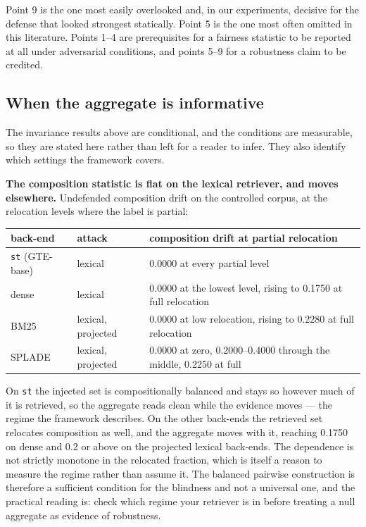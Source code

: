 \documentclass[authoryear,review,3p,times]{elsarticle}
\begin{document}
Point 9 is the one most easily overlooked and, in our experiments, decisive for the defense that looked strongest statically. Point 5 is the one most often omitted in this literature. Points 1--4 are prerequisites for a fairness statistic to be reported at all under adversarial conditions, and points 5--9 for a robustness claim to be credited.

\subsection{When the aggregate is informative}\label{scope-of-the-invariance}

The invariance results above are conditional, and the conditions are measurable, so they are stated here rather than left for a reader to infer. They also identify which settings the framework covers.

\textbf{The composition statistic is flat on the lexical retriever, and moves elsewhere.} Undefended composition drift on the controlled corpus, at the relocation levels where the label is partial:

\begin{center}
\begin{tabular}{lll}
\hline
back-end & attack & composition drift at partial relocation \\
\hline
\texttt{st} (GTE-base) & lexical & 0.0000 at every partial level \\
dense & lexical & 0.0000 at the lowest level, rising to 0.1750 at full relocation \\
BM25 & lexical, projected & 0.0000 at low relocation, rising to 0.2280 at full relocation \\
SPLADE & lexical, projected & 0.0000 at zero, 0.2000--0.4000 through the middle, 0.2250 at full \\
\hline
\end{tabular}
\end{center}

On \texttt{st} the injected set is compositionally balanced and stays so however much of it is retrieved, so the aggregate reads clean while the evidence moves --- the regime the framework describes. On the other back-ends the retrieved set relocates composition as well, and the aggregate moves with it, reaching 0.1750 on dense and 0.2 or above on the projected lexical back-ends. The dependence is not strictly monotone in the relocated fraction, which is itself a reason to measure the regime rather than assume it. The balanced pairwise construction is therefore a sufficient condition for the blindness and not a universal one, and the practical reading is: check which regime your retriever is in before treating a null aggregate as evidence of robustness.
\end{document}
